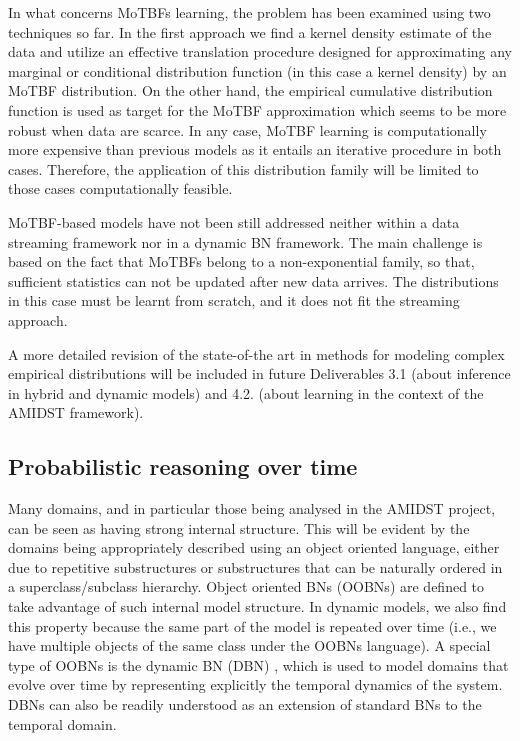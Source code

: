In what concerns MoTBFs learning, the problem has been examined using two techniques so far. In the first approach we find a kernel density estimate of the data and utilize an effective translation procedure designed for approximating any marginal or conditional distribution function (in this case a kernel density) by an MoTBF distribution. On the other hand, the empirical cumulative distribution function is used as target for the MoTBF approximation which seems to be more robust when data are scarce. In any case, MoTBF learning is computationally more expensive than previous models as it entails an iterative procedure in both cases. Therefore, the application of this distribution family will be limited to those cases computationally feasible.

MoTBF-based models have not been still addressed neither within a data streaming framework nor in a dynamic BN framework. The main challenge is based on the fact that MoTBFs belong to a non-exponential family, so that, sufficient statistics can not be updated after new data arrives. The distributions in this case must be learnt from scratch, and it does not fit the streaming approach. 

A more detailed revision of the state-of-the art in methods for modeling complex empirical distributions will be included in future Deliverables 3.1 (about inference in hybrid and dynamic models) and 4.2. (about learning in the context of the AMIDST framework).


\subsection{Probabilistic reasoning over time}\label{SubSection:DBNs}

Many domains, and in particular those being analysed in the AMIDST project, can be seen as having strong internal structure. This will be evident by the domains being appropriately described using an object oriented language, either due to repetitive substructures or substructures that can be naturally ordered in a superclass/subclass hierarchy.  Object oriented BNs \cite{KollerPfeffer1997} (OOBNs) are defined to take advantage of such internal model structure. In dynamic models, we also find this property because the same part of the model is repeated over time (i.e., we have multiple objects of the same class under the OOBNs language). A special type of OOBNs is the dynamic BN (DBN) \cite{DeanKanazawa1989}, which is used to model domains that evolve over time by representing explicitly the temporal dynamics of the system. DBNs can also be readily understood as an extension of standard BNs to the temporal domain. 

